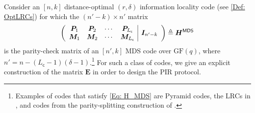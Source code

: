 \documentclass[twocolumn,conference]{IEEEtran}
\newcommand{\GF}{\mathrm{GF}}                %
\begin{document}
Consider an $[n,k]$ distance-optimal $(r,\delta)$ information locality code (see \cref{Def: OptLRCs}) for which
the $(n'-k) \times n'$ matrix
  \begin{align}
  \label{Eq: H_MDS}
  \left(\begin{array}{cccc|c}
          \bm P_1 & \bm P_2 & \cdots & \bm P_{L_{\mathsf c}} & \multirow{2}*{$\bm I_{n'-k}$} \\
          \bm M_1 & \bm M_2 & \cdots & \bm M_{L_{\mathsf c}} & \\
        \end{array}\right) \triangleq \bm H^{\mathsf{MDS}}
\end{align}
is the parity-check matrix of an $[n',k]$ MDS code over $\GF(q)$, where
$n'=n-(L_\mathsf{c}-1)(\delta-1)$.\footnote{Examples of codes that satisfy \eqref{Eq: H_MDS} are Pyramid codes, the LRCs in \cite{Hua12}, and codes from the parity-splitting construction of \cite{Kam14}.} For such a class of codes, we give an explicit construction of the matrix $\bm E$ in order to design the PIR
protocol. 
\end{document}
